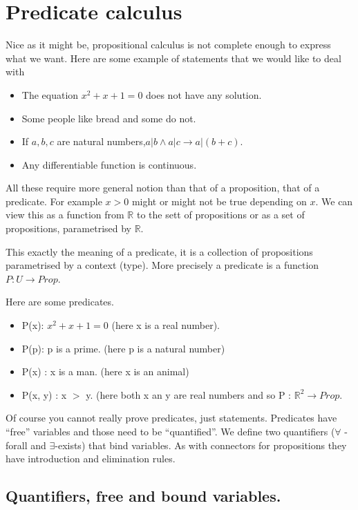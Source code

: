 \section{Predicate calculus}\label{sec:predicatecalculus}

Nice as it might be, propositional calculus is not complete enough to express what we want. Here are some example of statements that we would like to deal with
\begin{itemize}
\item The equation $x^2+x+1=0$ does not have any solution.
\item Some people like bread and some do not.
\item If $a,b, c$ are natural numbers,$a|b \land a | c \rightarrow a | (b+c)$.
\item Any differentiable function is continuous.
\end{itemize}

All these require more general notion than that of a proposition, that of a predicate. 
For example $x>0$ might or might not be true depending on $x$. We can view this as a function from $\mathbb{R}$ to the sett of propositions or as a set of propositions, parametrised by $\mathbb{R}$. 

This exactly the meaning of a predicate, it is a collection of propositions parametrised by a context (type). More precisely a predicate is a function $P: U \rightarrow Prop$. 

Here are some predicates.

\begin{itemize}
\item P(x): $x^{2}+x+1 =0$ (here x is a real number).
\item P(p): p is a prime. (here p is a natural number)
\item P(x) : x is a man. (here x is an animal)
\item P(x, y) : x $>$ y. (here both x an y are real numbers and so P : $\mathbb{R}^{2}\rightarrow Prop.$

\end{itemize}	

Of course you cannot really prove predicates, just statements. Predicates have ``free'' variables and those need to be ``quantified''. We define two quantifiers ($\forall$ - forall and $\exists$-exists) that bind variables. As with connectors for propositions they have introduction and elimination rules.

\subsection{ Quantifiers, free and bound variables.}

